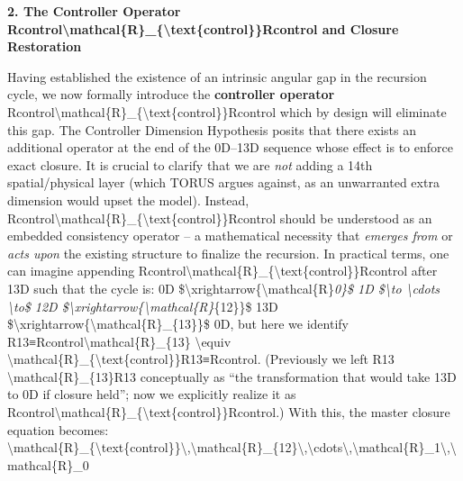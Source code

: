 \documentclass[
]{article}
\begin{document}
\textbf{2. The Controller Operator
Rcontrol\textbackslash mathcal\{R\}\_\{\textbackslash text\{control\}\}Rcontrol\hspace{0pt}
and Closure Restoration}

Having established the existence of an intrinsic angular gap in the
recursion cycle, we now formally introduce the \textbf{controller
operator}
Rcontrol\textbackslash mathcal\{R\}\_\{\textbackslash text\{control\}\}Rcontrol\hspace{0pt}
which by design will eliminate this gap. The Controller Dimension
Hypothesis posits that there exists an additional operator at the end of
the 0D--13D sequence whose effect is to enforce exact closure. It is
crucial to clarify that we are \emph{not} adding a 14th spatial/physical
layer (which TORUS argues against, as an unwarranted extra dimension
would upset the model\hspace{0pt}). Instead,
Rcontrol\textbackslash mathcal\{R\}\_\{\textbackslash text\{control\}\}Rcontrol\hspace{0pt}
should be understood as an embedded consistency operator -- a
mathematical necessity that \emph{emerges from} or \emph{acts upon} the
existing structure to finalize the recursion. In practical terms, one
can imagine appending
Rcontrol\textbackslash mathcal\{R\}\_\{\textbackslash text\{control\}\}Rcontrol\hspace{0pt}
after 13D such that the cycle is: 0D
\$\textbackslash xrightarrow\{\textbackslash mathcal\{R\}\emph{0\}\$ 1D
\$\textbackslash to \textbackslash cdots \textbackslash to\$ 12D
\$\textbackslash xrightarrow\{\textbackslash mathcal\{R\}}\{12\}\}\$ 13D
\$\textbackslash xrightarrow\{\textbackslash mathcal\{R\}\_\{13\}\}\$
0D, but here we identify R13≡Rcontrol\textbackslash mathcal\{R\}\_\{13\}
\textbackslash equiv
\textbackslash mathcal\{R\}\_\{\textbackslash text\{control\}\}R13\hspace{0pt}≡Rcontrol\hspace{0pt}.
(Previously we left R13
\textbackslash mathcal\{R\}\_\{13\}R13\hspace{0pt} conceptually as ``the
transformation that would take 13D to 0D if closure held''; now we
explicitly realize it as
Rcontrol\textbackslash mathcal\{R\}\_\{\textbackslash text\{control\}\}Rcontrol\hspace{0pt}.)
With this, the master closure equation becomes:\\
\textbackslash mathcal\{R\}\_\{\textbackslash text\{control\}\}\textbackslash,\textbackslash mathcal\{R\}\_\{12\}\textbackslash,\textbackslash cdots\textbackslash,\textbackslash mathcal\{R\}\_1\textbackslash,\textbackslash mathcal\{R\}\_0
\end{document}
